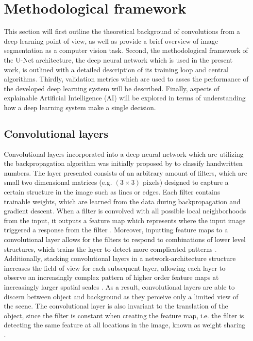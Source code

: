 \documentclass[../main/thesis.tex]{subfiles}
\begin{document}
\section{Methodological framework}
\label{sec:methodology}
This section will first outline the theoretical background of convolutions from a deep learning point of view, as well as provide a brief overview of image segmentation as a computer vision task. Second, the methodological framework of the U-Net architecture, the deep neural network which is used in the present work, is outlined with a detailed description of its training loop and central algorithms. Thirdly, validation metrics which are used to asses the performance of the developed deep learning system will be described. Finally, aspects of explainable Artificial Intelligence (AI) will be explored in terms of understanding how a deep learning system make a single decision. 

\subsection{Convolutional layers}
\label{sec:convolutional-layer}
Convolutional layers incorporated into a deep neural network which are utilizing the backpropagation algorithm \citep{Rumelhart1986} was initially proposed by \citet{LeCun1989} to classify handwritten numbers. The layer \citet{LeCun1989} presented consists of an arbitrary amount of filters, which are small two dimensional matrices (e.g. $(3 \times 3)$ pixels) designed to capture a certain structure in the image such as lines or edges. Each filter contains trainable weights, which are learned from the data during backpropagation \citep{LeCun1989} and gradient descent. When a filter is convolved with all possible local neighborhoods from the input, it outputs a feature map which represents where the input image triggered a response from the filter \citep{Zeiler2010}. Moreover, inputting feature maps to a convolutional layer allows for the filters to respond to combinations of lower level structures, which trains the layer to detect more complicated patterns \citep{Fukushima1980}. Additionally, stacking convolutional layers in a network-architecture structure increases the field of view for each subsequent layer, allowing each layer to observe an increasingly complex pattern of higher order feature maps at increasingly larger spatial scales \citep{Fukushima1980}. As a result, convolutional layers are able to discern between object and background as they perceive only a limited view of the scene. The convolutional layer is also invariant to the translation of the object, since the filter is constant when creating the feature map, i.e. the filter is detecting the same feature at all locations in the image, known as weight sharing \citep{LeCun1989}.
\end{document}
